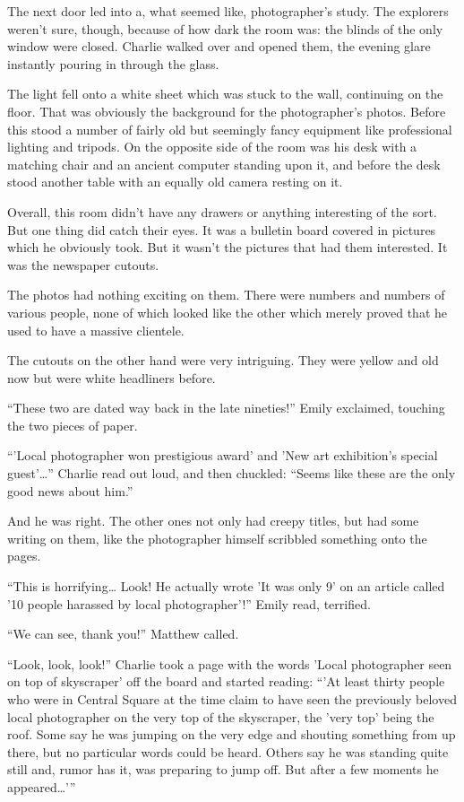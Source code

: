 The next door led into a, what seemed like, photographer's study. The explorers weren't sure, though, because of how dark the room was: the blinds of the only window were closed. Charlie walked over and opened them, the evening glare instantly pouring in through the glass.

The light fell onto a white sheet which was stuck to the wall, continuing on the floor. That was obviously the background for the photographer's photos. Before this stood a number of fairly old but seemingly fancy equipment like professional lighting and tripods. On the opposite side of the room was his desk with a matching chair and an ancient computer standing upon it, and before the desk stood another table with an equally old camera resting on it.

Overall, this room didn't have any drawers or anything interesting of the sort. But one thing did catch their eyes. It was a bulletin board covered in pictures which he obviously took. But it wasn't the pictures that had them interested. It was the newspaper cutouts.

The photos had nothing exciting on them. There were numbers and numbers of various people, none of which looked like the other which merely proved that he used to have a massive clientele.

The cutouts on the other hand were very intriguing. They were yellow and old now but were white headliners before.

“These two are dated way back in the late nineties!” Emily exclaimed, touching the two pieces of paper.

“'Local photographer won prestigious award' and 'New art exhibition's special guest'…” Charlie read out loud, and then chuckled: “Seems like these are the only good news about him.”

And he was right. The other ones not only had creepy titles, but had some writing on them, like the photographer himself scribbled something onto the pages.

“This is horrifying… Look! He actually wrote 'It was only 9' on an article called '10 people harassed by local photographer'!” Emily read, terrified.

“We can see, thank you!” Matthew called.

“Look, look, look!” Charlie took a page with the words 'Local photographer seen on top of skyscraper' off the board and started reading: “'At least thirty people who were in Central Square at the time claim to have seen the previously beloved local photographer on the very top of the skyscraper, the 'very top' being the roof. Some say he was jumping on the very edge and shouting something from up there, but no particular words could be heard. Others say he was standing quite still and, rumor has it, was preparing to jump off. But after a few moments he appeared…'”

